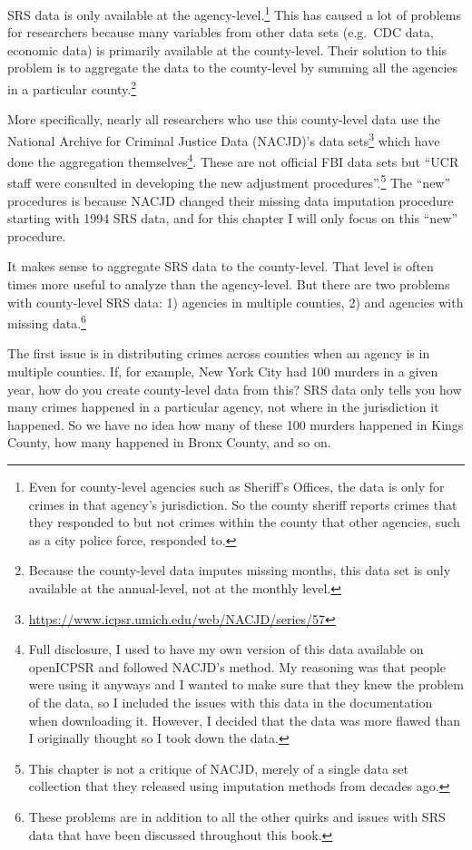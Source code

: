 \documentclass[
]{krantz}
\renewcommand{\href}[2]{#2\footnote{\url{#1}}}
\begin{document}
SRS data is only available at the agency-level.\footnote{Even
  for county-level agencies such as Sheriff's Offices, the
  data is only for crimes in that agency's jurisdiction. So
  the county sheriff reports crimes that they responded to
  but not crimes within the county that other agencies, such
  as a city police force, responded to.} This has caused a
lot of problems for researchers because many variables from
other data sets (e.g.~CDC data, economic data) is primarily
available at the county-level. Their solution to this
problem is to aggregate the data to the county-level by
summing all the agencies in a particular county.\footnote{Because
  the county-level data imputes missing months, this data set
  is only available at the annual-level, not at the monthly
  level.}

More specifically, nearly all researchers who use this
county-level data use the National Archive for Criminal
Justice Data (NACJD)'s
\href{https://www.icpsr.umich.edu/web/NACJD/series/57}{data sets}
which have done the aggregation themselves\footnote{Full
  disclosure, I used to have my own version of this data
  available on openICPSR and followed NACJD's method. My
  reasoning was that people were using it anyways and I
  wanted to make sure that they knew the problem of the
  data, so I included the issues with this data in the
  documentation when downloading it. However, I decided that
  the data was more flawed than I originally thought so I
  took down the data.}. These are not official FBI data sets
but ``UCR staff were consulted in developing the new
adjustment procedures''.\footnote{This chapter is not a
  critique of NACJD, merely of a single data set collection
  that they released using imputation methods from decades
  ago.} The ``new'' procedures is because NACJD changed
their missing data imputation procedure starting with 1994
SRS data, and for this chapter I will only focus on this
``new'' procedure.

It makes sense to aggregate SRS data to the county-level.
That level is often times more useful to analyze than the
agency-level. But there are two problems with county-level
SRS data: 1) agencies in multiple counties, 2) and agencies
with missing data.\footnote{These problems are in addition
  to all the other quirks and issues with SRS data that have
  been discussed throughout this book.}

The first issue is in distributing crimes across counties
when an agency is in multiple counties. If, for example, New
York City had 100 murders in a given year, how do you create
county-level data from this? SRS data only tells you how
many crimes happened in a particular agency, not where in
the jurisdiction it happened. So we have no idea how many of
these 100 murders happened in Kings County, how many
happened in Bronx County, and so on.
\end{document}
